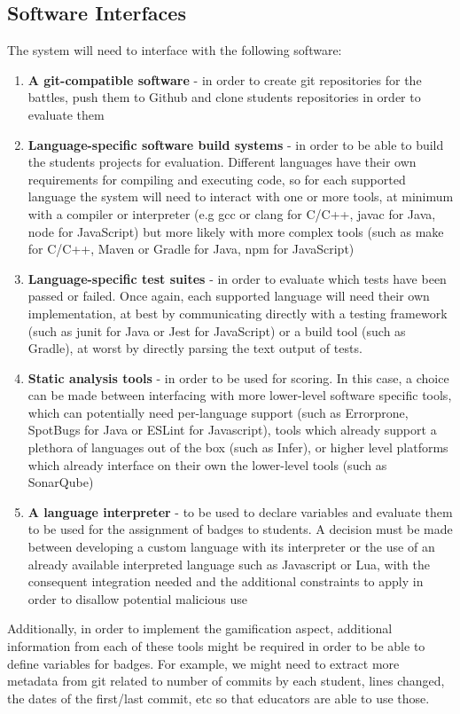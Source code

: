 \subsection{Software Interfaces}
The system will need to interface with the following software:
\begin{enumerate}
      \item \textbf{A git-compatible software} {-} in order to create git repositories for
            the battles, push them to Github and clone students repositories in order to evaluate
            them
      \item \textbf{Language-specific software build systems} {-} in order to be able to build
            the students projects for evaluation. Different languages have their own
            requirements for compiling and executing code, so for each supported language
            the system will need to interact with one or more tools, at minimum with a
            compiler or interpreter (e.g gcc or clang for C/C++, javac for Java, node for
            JavaScript) but more likely with more complex tools (such as make for C/C++,
            Maven or Gradle for Java, npm for JavaScript)
      \item \textbf{Language-specific test suites} {-} in order to evaluate which
            tests have been passed or failed. Once again, each supported language
            will need their own implementation, at best by communicating directly
            with a testing framework (such as junit for Java or Jest for JavaScript)
            or a build tool (such as Gradle), at worst by directly parsing the text
            output of tests.
      \item \textbf{Static analysis tools} {-} in order to be used for scoring. In this
            case, a choice can be made between interfacing with more lower-level software
            specific tools, which can potentially need per-language support (such as
            Errorprone, SpotBugs for Java or ESLint for Javascript), tools which already
            support a plethora of languages out of the box (such as Infer), or higher level
            platforms which already interface on their own the lower-level tools (such as
            SonarQube)
      \item \textbf{A language interpreter} {-} to be used to declare variables and evaluate
            them to be used for the assignment of badges to students. A decision must be made
            between developing a custom language with its interpreter or the use of an already
            available interpreted language such as Javascript or Lua, with the consequent
            integration needed and the additional constraints to apply in order to disallow
            potential malicious use
\end{enumerate}
Additionally, in order to implement the gamification aspect, additional information
from each of these tools might be required in order to be able to define variables
for badges. For example, we might need to extract more metadata from git
related to number of commits by each student, lines changed, the dates of
the first/last commit, etc so that educators are able to use those.

